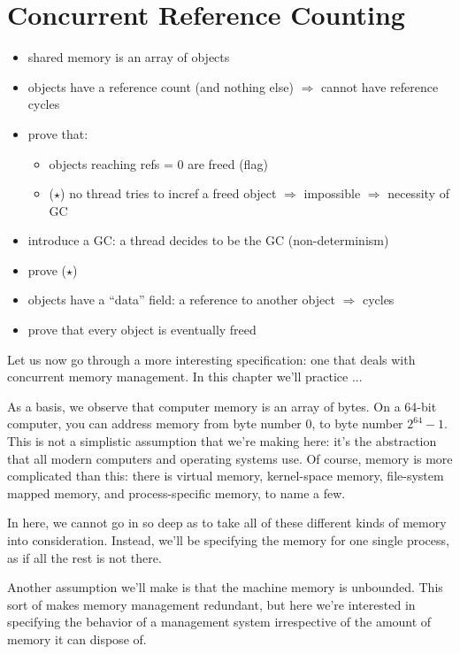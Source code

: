 \chapter{Concurrent Reference Counting}\label{ch:concurrent-reference-counting}

\begin{itemize}
	\item shared memory is an array of objects
	\item objects have a reference count (and nothing else) $\Rightarrow$ cannot have reference cycles
	
	\item prove that:
	\begin{itemize}
		\item objects reaching refs = 0 are freed (flag)
		\item ($\star$) no thread tries to incref a freed object $\Rightarrow$ impossible $\Rightarrow$ necessity of GC
	\end{itemize}

	\item introduce a GC: a thread decides to be the GC (non-determinism)
	\item prove ($\star$)
	
	\item objects have a ``data'' field: a reference to another object $\Rightarrow$ cycles
	
	\item prove that every object is eventually freed
\end{itemize}

Let us now go through a more interesting specification: one that deals with concurrent memory management.
In this chapter we'll practice ...

As a basis, we observe that computer memory is an array of bytes.
On a 64-bit computer, you can address memory from byte number 0, to byte number $2^{64} - 1$.
This is not a simplistic assumption that we're making here: it's the abstraction that all modern computers and operating systems use.
Of course, memory is more complicated than this: there is virtual memory, kernel-space memory, file-system mapped memory, and process-specific memory, to name a few.

In here, we cannot go in so deep as to take all of these different kinds of memory into consideration.
Instead, we'll be specifying the memory for one single process, as if all the rest is not there.

Another assumption we'll make is that the machine memory is unbounded.
This sort of makes memory management redundant, but here we're interested in specifying the behavior of a management system irrespective of the amount of memory it can dispose of.

